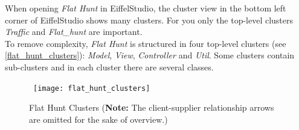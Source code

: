 When opening \emph{Flat Hunt} in EiffelStudio, the cluster view in the bottom left corner of EiffelStudio shows many clusters. For you only the top-level clusters \emph{Traffic} and \emph{Flat\_hunt} are important.\\

To remove complexity, \emph{Flat Hunt} is structured in four top-level clusters (see \autoref{flat_hunt_clusters}): \emph{Model}, \emph{View}, \emph{Controller} and \emph{Util}. Some clusters contain sub-clusters and in each cluster there are several classes.

\begin{figure}[h]
\centerline{\hbox{  
  \texttt{[image: flat\_hunt\_clusters]}
  }}
  \caption{Flat Hunt Clusters (\textbf{Note:} The client-supplier relationship arrows are omitted for the sake of overview.)}
\label{flat_hunt_clusters}
\end{figure}
